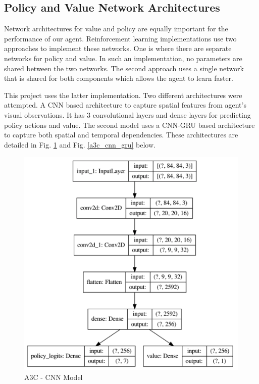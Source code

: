 \documentclass[conference]{IEEEtran}
\begin{document}
\subsection{\textbf{Policy and Value Network Architectures}}

Network architectures for value and policy are equally important for the performance of our agent. Reinforcement learning implementations use two approaches to implement these networks. One is where there are separate networks for policy and value. In such an implementation, no parameters are shared between the two networks. The second approach uses a single network that is shared for both components which allows the agent to learn faster. 

This project uses the latter implementation. Two different architectures were attempted. A CNN based architecture to capture spatial features from agent’s visual observations. It has 3 convolutional layers and dense layers for predicting policy actions and value. The second model uses a CNN-GRU based architecture to capture both spatial and temporal dependencies. These architectures are detailed in Fig. \ref{a3c_cnn} and Fig. \ref{a3c_cnn_gru} below. 

\begin{figure}[htp]
    \centering
    \includegraphics[width=\linewidth]{a3c_cnn.png}
    \caption{A3C - CNN Model}
    \label{a3c_cnn}
\end{figure}
\end{document}
